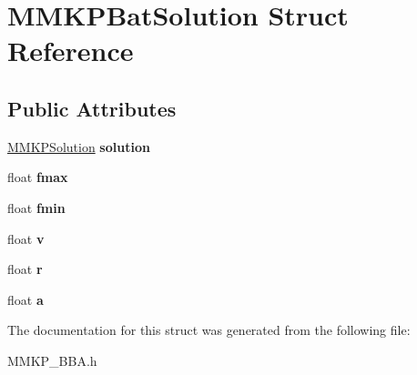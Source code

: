 \hypertarget{struct_m_m_k_p_bat_solution}{\section{M\+M\+K\+P\+Bat\+Solution Struct Reference}
\label{struct_m_m_k_p_bat_solution}
}
\subsection*{Public Attributes}
\begin{DoxyCompactItemize}
\item 
\hypertarget{struct_m_m_k_p_bat_solution_a2642a61440f4996e4dfd57ae9e08531a}{\hyperlink{class_m_m_k_p_solution}{M\+M\+K\+P\+Solution} {\bfseries solution}}\label{struct_m_m_k_p_bat_solution_a2642a61440f4996e4dfd57ae9e08531a}

\item 
\hypertarget{struct_m_m_k_p_bat_solution_a51eba1b4c0e6e90352fb865dacc88672}{float {\bfseries fmax}}\label{struct_m_m_k_p_bat_solution_a51eba1b4c0e6e90352fb865dacc88672}

\item 
\hypertarget{struct_m_m_k_p_bat_solution_a3eaaabb2bae75a98682ac18f0395a16b}{float {\bfseries fmin}}\label{struct_m_m_k_p_bat_solution_a3eaaabb2bae75a98682ac18f0395a16b}

\item 
\hypertarget{struct_m_m_k_p_bat_solution_a2d8ed1614b6be9a1417e3743fcaf3370}{float {\bfseries v}}\label{struct_m_m_k_p_bat_solution_a2d8ed1614b6be9a1417e3743fcaf3370}

\item 
\hypertarget{struct_m_m_k_p_bat_solution_a5989292ce39bae0f449b71eff8b320fa}{float {\bfseries r}}\label{struct_m_m_k_p_bat_solution_a5989292ce39bae0f449b71eff8b320fa}

\item 
\hypertarget{struct_m_m_k_p_bat_solution_af6cb17c4270d545c5facb142f9a7d446}{float {\bfseries a}}\label{struct_m_m_k_p_bat_solution_af6cb17c4270d545c5facb142f9a7d446}

\end{DoxyCompactItemize}


The documentation for this struct was generated from the following file\+:\begin{DoxyCompactItemize}
\item 
M\+M\+K\+P\+\_\+\+B\+B\+A.\+h\end{DoxyCompactItemize}
